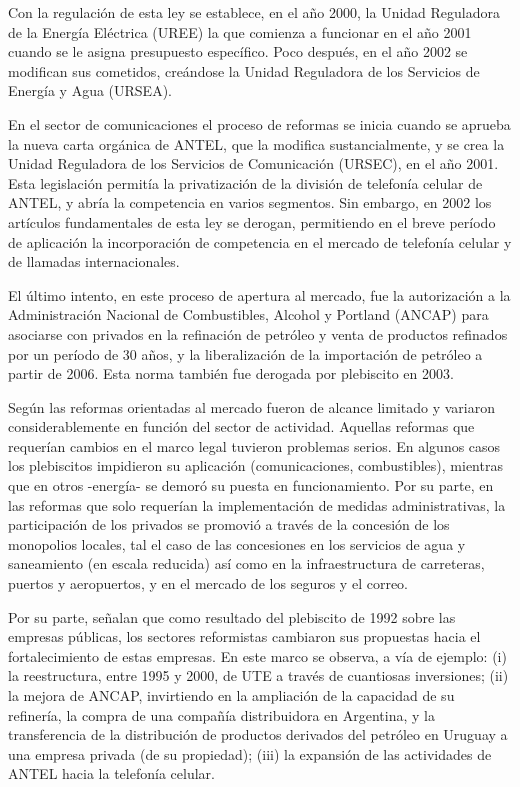 \documentclass[
  12pt,
  spanish,
]{book}
\begin{document}
Con la regulación de esta ley se establece, en el año 2000, la Unidad Reguladora de la Energía Eléctrica (UREE) la que comienza a funcionar en el año 2001 cuando se le asigna presupuesto específico. Poco después, en el año 2002 se modifican sus cometidos, creándose la Unidad Reguladora de los Servicios de Energía y Agua (URSEA).

En el sector de comunicaciones el proceso de reformas se inicia cuando se aprueba la nueva carta orgánica de ANTEL, que la modifica sustancialmente, y se crea la Unidad Reguladora de los Servicios de Comunicación (URSEC), en el año 2001. Esta legislación permitía la privatización de la división de telefonía celular de ANTEL, y abría la competencia en varios segmentos. Sin embargo, en 2002 los artículos fundamentales de esta ley se derogan, permitiendo en el breve período de aplicación la incorporación de competencia en el mercado de telefonía celular y de llamadas internacionales.

El último intento, en este proceso de apertura al mercado, fue la autorización a la Administración Nacional de Combustibles, Alcohol y Portland (ANCAP) para asociarse con privados en la refinación de petróleo y venta de productos refinados por un período de 30 años, y la liberalización de la importación de petróleo a partir de 2006. Esta norma también fue derogada por plebiscito en 2003.

Según \citet{Bergara2005} las reformas orientadas al mercado fueron de alcance limitado y variaron considerablemente en función del sector de actividad. Aquellas reformas que requerían cambios en el marco legal tuvieron problemas serios. En algunos casos los plebiscitos impidieron su aplicación (comunicaciones, combustibles), mientras que en otros -energía- se demoró su puesta en funcionamiento. Por su parte, en las reformas que solo requerían la implementación de medidas administrativas, la participación de los privados se promovió a través de la concesión de los monopolios locales, tal el caso de las concesiones en los servicios de agua y saneamiento (en escala reducida) así como en la infraestructura de carreteras, puertos y aeropuertos, y en el mercado de los seguros y el correo.

Por su parte, \citet{Forteza2003} señalan que como resultado del plebiscito de 1992 sobre las empresas públicas, los sectores reformistas cambiaron sus propuestas hacia el fortalecimiento de estas empresas. En este marco se observa, a vía de ejemplo: (i) la reestructura, entre 1995 y 2000, de UTE a través de cuantiosas inversiones; (ii) la mejora de ANCAP, invirtiendo en la ampliación de la capacidad de su refinería, la compra de una compañía distribuidora en Argentina, y la transferencia de la distribución de productos derivados del petróleo en Uruguay a una empresa privada (de su propiedad); (iii) la expansión de las actividades de ANTEL hacia la telefonía celular.
\end{document}
